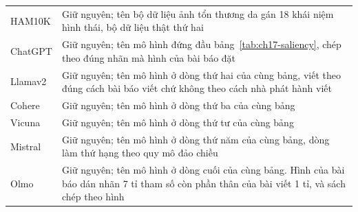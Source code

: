 \begin{longtable}{@{}lp{7cm}@{}}
HAM10K & Giữ nguyên; tên bộ dữ liệu ảnh tổn thương da gán 18 khái niệm hình thái, bộ dữ liệu thật thứ hai \\
ChatGPT & Giữ nguyên; tên mô hình đứng đầu bảng~\ref{tab:ch17-saliency}, chép theo đúng nhãn mà hình của bài báo đặt \\
Llamav2 & Giữ nguyên; tên mô hình ở dòng thứ hai của cùng bảng, viết theo đúng cách bài báo viết chứ không theo cách nhà phát hành viết \\
Cohere & Giữ nguyên; tên mô hình ở dòng thứ ba của cùng bảng \\
Vicuna & Giữ nguyên; tên mô hình ở dòng thứ tư của cùng bảng \\
Mistral & Giữ nguyên; tên mô hình ở dòng thứ năm của cùng bảng, dòng làm thứ hạng theo quy mô đảo chiều \\
Olmo & Giữ nguyên; tên mô hình ở dòng cuối của cùng bảng. Hình của bài báo dán nhãn 7 tỉ tham số còn phần thân của bài viết 1 tỉ, và sách chép theo hình \\
\end{longtable}
\normalsize
